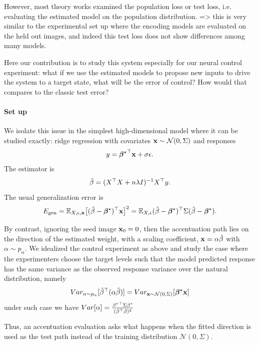 \documentclass{article}
\theoremstyle{plain}
\theoremstyle{definition}
\begin{document}
\clearpage






However, most theory works examined the population loss or test loss, i.e. evaluating the estimated model on the population distribution. => this is very similar to the experimental set up where the encoding models are evaluated on the held out images, and indeed this test loss does not show differences among many models.

Here our contribution is to study this system especially for our neural control experiment: what if we use the estimated models to propose new inputs to drive the system to a target state, what will be the error of control? How would that compares to the classic test error?

\paragraph{Set up}
We isolate this issue in the simplest high-dimensional model where it can be studied exactly: ridge regression with covariates $\mathbf{x}\sim\mathcal{N}(0,\Sigma)$ and responses
\begin{equation}
    y = {\boldsymbol{\beta}^{\star}}^{\top} \mathbf{x} + \sigma \epsilon .
\end{equation}
The estimator is
\begin{equation}
    \hat{\beta} = (X^\top X + n\lambda I)^{-1}X^\top y.
\end{equation}
The usual generalization error is
\begin{equation}
    E_{\mathrm{gen}} = \mathbb{E}_{X,\epsilon,\mathbf{x}}\bigl[(\hat{\beta}-\boldsymbol{\beta}^{\star})^\top \mathbf{x}\bigr]^2
    = \mathbb{E}_{X,\epsilon}(\hat{\beta}-\boldsymbol{\beta}^{\star})^\top\Sigma(\hat{\beta}-\boldsymbol{\beta}^{\star}).
\end{equation}

By contrast, ignoring the seed image $\mathbf{x}_0=0$, then the accentuation path lies on the direction of the estimated weight, with a scaling coefficient, $\mathbf{x}=\alpha \hat{\beta}$ with $\alpha\sim p_\alpha$.
We idealized the control experiment as above and study the case where the experimenters choose the target levels such that the model predicted response has the same variance as the observed response variance over the natural distribution, namely
$$Var_{\alpha\sim p_\alpha}[\hat{\beta}^\top (\alpha \hat{\beta})]=Var_{\mathbf{x}\sim\mathcal{N}(0,\Sigma)}[\boldsymbol{\beta}^{\star} \mathbf{x}]$$
under such case we have $Var[\alpha]=\frac{{{\beta^{\star}}}^{\top}\Sigma{\beta^{\star}}}{({\hat{\beta}}^{\top}\hat{\beta})^{2}}$

Thus, an accentuation evaluation asks what happens when the fitted direction is used as the test path instead of the training distribution $\mathcal{N}(0,\Sigma)$.
\end{document}
